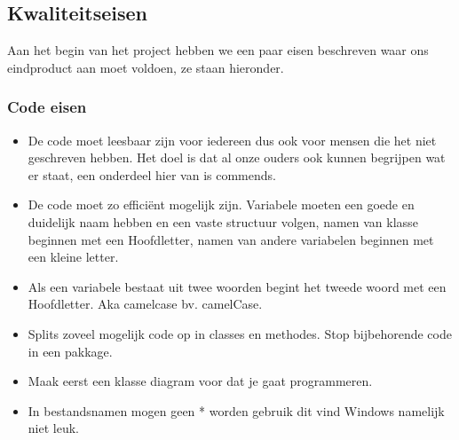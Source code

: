 \documentclass{article}
\begin{document}
\newpage

\subsection{Kwaliteitseisen}
Aan het begin van het project hebben we een paar eisen beschreven waar ons eindproduct aan moet voldoen, ze staan hieronder.

\subsubsection{Code eisen}
\begin{itemize}
\item De code moet leesbaar zijn voor iedereen dus ook voor mensen die het niet geschreven hebben. Het doel is dat al onze ouders ook kunnen begrijpen wat er staat, een onderdeel hier van is
 commends.
\item De code moet zo efficiënt mogelijk zijn.
Variabele moeten een goede en duidelijk naam hebben en een vaste structuur volgen, namen van klasse beginnen met een Hoofdletter, namen van andere variabelen beginnen met een kleine letter.
        \item Als een variabele bestaat uit twee woorden begint het tweede woord met een Hoofdletter. Aka camelcase bv. camelCase.
        \item Splits zoveel mogelijk code op in classes en methodes. Stop bijbehorende code in een pakkage.
        \item Maak eerst een klasse diagram voor dat je gaat programmeren.
        \item In bestandsnamen mogen geen * worden gebruik dit vind Windows namelijk niet leuk.
\end{itemize}
\end{document}
